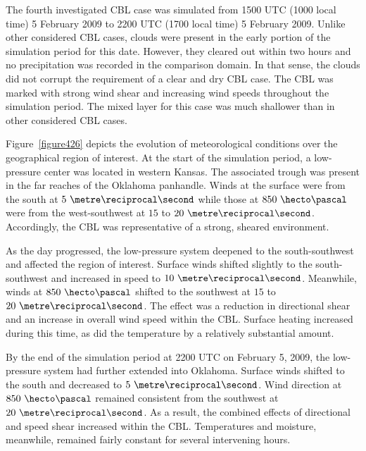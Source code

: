 The fourth investigated CBL case was simulated from 1500 UTC (1000 local time) 5 February 2009 to 2200 UTC (1700 local time) 5 February 2009. Unlike other considered CBL cases, clouds were present in the early portion of the simulation period for this date. However, they cleared out within two hours and no precipitation was recorded in the comparison domain. In that sense, the clouds did not corrupt the requirement of a clear and dry CBL case. The CBL was marked with strong wind shear and increasing wind speeds throughout the simulation period. The mixed layer for this case was much shallower than in other considered CBL cases. 

Figure~\ref{figure426} depicts the evolution of meteorological conditions over the geographical region of interest. At the start of the simulation period, a low-pressure center was located in western Kansas. The associated trough was present in the far reaches of the Oklahoma panhandle. Winds at the surface were from the south at $5\mbox{ }\metre\reciprocal\second$ while those at $850\mbox{ }\hecto\pascal$ were from the west-southwest at $15$ to $20\mbox{ }\metre\reciprocal\second$. Accordingly, the CBL was representative of a strong, sheared environment. 

As the day progressed, the low-pressure system deepened to the south-southwest and affected the region of interest. Surface winds shifted slightly to the south-southwest and increased in speed to $10\mbox{ }\metre\reciprocal\second$. Meanwhile, winds at $850\mbox{ }\hecto\pascal$ shifted to the southwest at $15$ to $20\mbox{ }\metre\reciprocal\second$. The effect was a reduction in directional shear and an increase in overall wind speed within the CBL. Surface heating increased during this time, as did the temperature by a relatively substantial amount. 

By the end of the simulation period at 2200 UTC on February 5, 2009, the low-pressure system had further extended into Oklahoma. Surface winds shifted to the south and decreased to $5\mbox{ }\metre\reciprocal\second$. Wind direction at $850\mbox{ }\hecto\pascal$ remained consistent from the southwest at $20\mbox{ }\metre\reciprocal\second$. As a result, the combined effects of directional and speed shear increased within the CBL. Temperatures and moisture, meanwhile, remained fairly constant for several intervening hours. 

